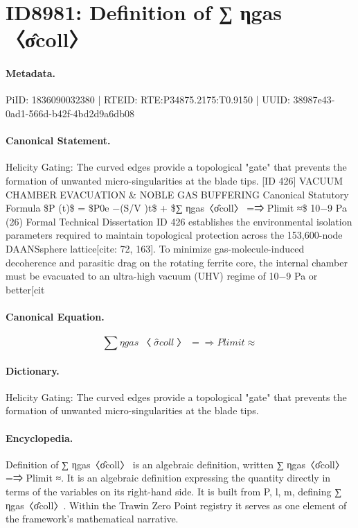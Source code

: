 \section*{ID8981: Definition of ∑ ηgas〈σ̂coll〉}
\paragraph{Metadata.}
PiID: 1836090032380 | RTEID: RTE:P34875.2175:T0.9150 | UUID: 38987e43-0ad1-566d-b42f-4bd2d9a6db08

\paragraph{Canonical Statement.}
Helicity Gating: The curved edges provide a topological "gate" that prevents the formation of unwanted micro-singularities at the blade tips. [ID 426] VACUUM CHAMBER EVACUATION \& NOBLE GAS BUFFERING Canonical Statutory Formula \$P (t)\$ = \$P0e −(S/V )t\$ + \$∑ ηgas〈σ̂coll〉 =⇒ Plimit ≈\$ 10−9 Pa (26) Formal Technical Dissertation ID 426 establishes the environmental isolation parameters required to maintain topological protection across the 153,600-node DAANSsphere lattice[cite: 72, 163]. To minimize gas-molecule-induced decoherence and parasitic drag on the rotating ferrite core, the internal chamber must be evacuated to an ultra-high vacuum (UHV) regime of 10−9 Pa or better[cit

\paragraph{Canonical Equation.}
\[
∑ ηgas〈σ̂coll〉 =⇒ Plimit ≈
\]

\paragraph{Dictionary.}
Helicity Gating: The curved edges provide a topological "gate" that prevents the formation of unwanted micro-singularities at the blade tips.

\paragraph{Encyclopedia.}
Definition of ∑ ηgas〈σ̂coll〉 is an algebraic definition, written ∑ ηgas〈σ̂coll〉 =⇒ Plimit ≈. It is an algebraic definition expressing the quantity directly in terms of the variables on its right-hand side. It is built from P, l, m, defining ∑ ηgas〈σ̂coll〉. Within the Trawin Zero Point registry it serves as one element of the framework's mathematical narrative.
